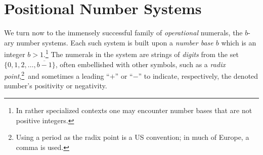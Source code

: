 \section{Positional Number Systems}
\label{sec:positional-numbers}

We turn now to the immensely successful family of {\em operational}
numerals, the $b$-ary number systems.  Each such system is built upon
a {\em number base $b$} which is an integer $b> 1$.\footnote{In
  rather specialized contexts one may encounter number bases that are
  not positive integers.}
The numerals in the system are strings of {\it digits} from the set
$\{0, 1, 2, \ldots, \overline{b-1}\}$, often embellished with other
symbols, such as a {\em radix point},\footnote{Using a period as the
  radix point is a US convention; in much of Europe, a comma is
  used.}~and sometimes a leading ``$+$'' or ``$-$'' to indicate,
respectively, the denoted number's positivity or negativity.

\medskip

\noindent {}

\medskip

